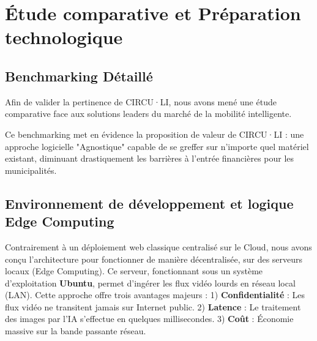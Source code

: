 \section{Étude comparative et Préparation technologique}

\subsection{Benchmarking Détaillé}
Afin de valider la pertinence de CIRCU·LI, nous avons mené une étude comparative face aux solutions leaders du marché de la mobilité intelligente.

\begin{table}[H]
    \centering
    \caption{Tableau comparatif des solutions de Smart Mobility}
\end{table}

Ce benchmarking met en évidence la proposition de valeur de CIRCU·LI : une approche logicielle "Agnostique" capable de se greffer sur n'importe quel matériel existant, diminuant drastiquement les barrières à l'entrée financières pour les municipalités.

\subsection{Environnement de développement et logique Edge Computing}
Contrairement à un déploiement web classique centralisé sur le Cloud, nous avons conçu l'architecture pour fonctionner de manière décentralisée, sur des serveurs locaux (Edge Computing). Ce serveur, fonctionnant sous un système d'exploitation \textbf{Ubuntu}, permet d'ingérer les flux vidéo lourds en réseau local (LAN). Cette approche offre trois avantages majeurs : 
1) \textbf{Confidentialité} : Les flux vidéo ne transitent jamais sur Internet public.
2) \textbf{Latence} : Le traitement des images par l'IA s'effectue en quelques millisecondes.
3) \textbf{Coût} : Économie massive sur la bande passante réseau.

